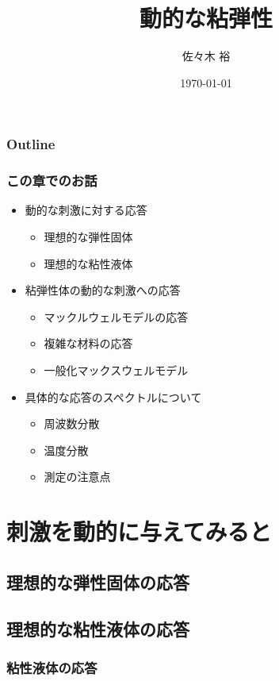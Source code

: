 \documentclass[12pt, dvipdfmx]{beamer}
\title
[動的な粘弾性]
{動的な粘弾性}
\author[東亞合成　佐々木]{佐々木 裕}
\institute[東亞合成]{東亞合成株式会社}
\date{\today}
\begin{document}
\maketitle

\begin{frame}
\frametitle{Outline}
\tableofcontents
\end{frame}

\begin{frame}
	\frametitle{この章でのお話}


	\begin{itemize}
		\item 動的な刺激に対する応答
        \begin{itemize}
			\item 理想的な弾性固体
			\item 理想的な粘性液体
		\end{itemize} 
		\item 粘弾性体の動的な刺激への応答
		\begin{itemize}
			\item マックルウェルモデルの応答
			\item 複雑な材料の応答
			\item 一般化マックスウェルモデル
		\end{itemize} 
		\item 具体的な応答のスペクトルについて
		\begin{itemize}
			\item 周波数分散
			\item 温度分散
			\item 測定の注意点
		\end{itemize}
	\end{itemize}
\end{frame}

\section{刺激を動的に与えてみると}
\subsection{理想的な弾性固体の応答}
\begin{frame}
    \frametitle{}

\end{frame}

\subsection{理想的な粘性液体の応答}
\begin{frame}
    \frametitle{粘性液体の応答}

\end{frame}
\end{document}
